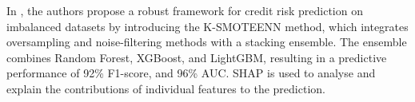     In \cite{damanik2025advanced}, the authors propose a robust framework for credit risk prediction on imbalanced datasets by introducing the K-SMOTEENN method, which integrates oversampling and noise-filtering methods with a stacking ensemble. The ensemble combines Random Forest, XGBoost, and LightGBM, resulting in a predictive performance of 92\% F1-score, and 96\% AUC. SHAP is used to analyse and explain the contributions of individual features to the prediction.\\
    



